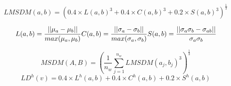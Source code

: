 
\begin{equation}
LMSDM(a,b) = (0.4\times L(a,b)^3+0.4\times C(a,b)^3+0.2\times S(a,b)^3)^{\frac{1}{3}}
\end{equation}

\begin{equation}
 L(a,b) = \frac{||\mu_a-\mu_b||}{max(\mu_a, \mu_b)}\\
 C(a,b) = \frac{||\sigma_a-\sigma_b||}{max(\sigma_a, \sigma_b)}\\
 S(a,b) = \frac{||\sigma_a\sigma_b -\sigma_{ab}||}{\sigma_a\sigma_b}
\end{equation}

\begin{equation}
MSDM(A,B) = (\frac{1}{n_w} \sum_{j=1}^{n_w}{LMSDM(a_j,b_j)^3})^{\frac{1}{3}}
\end{equation}
\begin{equation}
LD^h(v) = 0.4\times L^h(a,b)+0.4\times C^h(a,b)+0.2\times S^h(a,b)
\end{equation}
